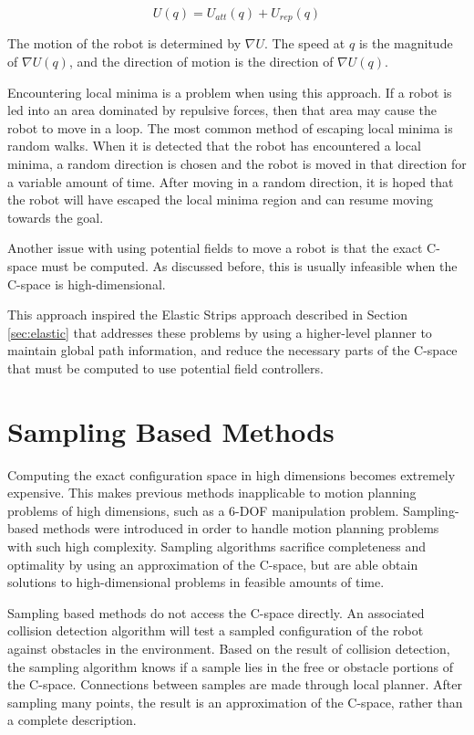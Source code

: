 \documentclass[10pt,conference]{ieeeconf}
\begin{document}
\begin{equation}
U(q) = U_{att}(q) + U_{rep}(q)
\end{equation}

The motion of the robot is determined by $\nabla U$. The speed at $q$ is the magnitude of $\nabla U(q)$, and the direction of motion is the direction of $\nabla U(q)$. 

Encountering local minima is a problem when using this approach. If a robot is led into an area dominated by repulsive forces, then that area may cause the robot to move in a loop. The most common method of escaping local minima is random walks. When it is detected that the robot has encountered a local minima, a random direction is chosen and the robot is moved in that direction for a variable amount of time. After moving in a random direction, it is hoped that the robot will have escaped the local minima region and can resume moving towards the goal.

Another issue with using potential fields to move a robot is that the exact C-space must be computed. As discussed before, this is usually infeasible when the C-space is high-dimensional.

This approach inspired the Elastic Strips approach described in Section \ref{sec:elastic} that addresses these problems by using a higher-level planner to maintain global path information, and reduce the necessary parts of the C-space that must be computed to use potential field controllers.

	
\section{Sampling Based Methods} \label{sec:sampling}

Computing the exact configuration space in high dimensions becomes extremely expensive. This makes previous methods inapplicable to motion planning problems of high dimensions, such as a 6-DOF manipulation problem. Sampling-based methods were introduced in order to handle motion planning problems with such high complexity. Sampling algorithms sacrifice completeness and optimality by using an approximation of the C-space, but are able obtain solutions to high-dimensional problems in feasible amounts of time.

Sampling based methods do not access the C-space directly. An associated collision detection algorithm will test a sampled configuration of the robot against obstacles in the environment. Based on the result of collision detection, the sampling algorithm knows if a sample lies in the free or obstacle portions of the C-space. Connections between samples are made through local planner. After sampling many points, the result is an approximation of the C-space, rather than a complete description. 
\end{document}
